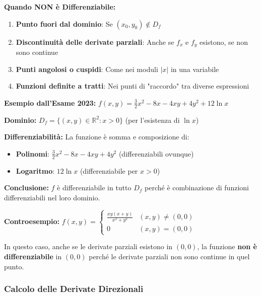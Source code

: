 \begin{errore}
\textbf{Quando NON è Differenziabile:}
\begin{enumerate}
    \item \textbf{Punto fuori dal dominio}: Se $(x_0,y_0) \notin D_f$
    \item \textbf{Discontinuità delle derivate parziali}: Anche se $f_x$ e $f_y$ esistono, se non sono continue
    \item \textbf{Punti angolosi o cuspidi}: Come nei moduli $|x|$ in una variabile
    \item \textbf{Funzioni definite a tratti}: Nei punti di "raccordo" tra diverse espressioni
\end{enumerate}
\end{errore}

\begin{esempio}
\textbf{Esempio dall'Esame 2023:} $f(x,y) = \frac{3}{2}x^{2} - 8x - 4xy + 4y^{2} + 12 \ln x$

\textbf{Dominio:} $D_f = \{(x,y) \in \mathbb{R}^2 : x > 0\}$ (per l'esistenza di $\ln x$)

\textbf{Differenziabilità:} La funzione è somma e composizione di:
\begin{itemize}
    \item \textbf{Polinomi}: $\frac{3}{2}x^{2} - 8x - 4xy + 4y^{2}$ (differenziabili ovunque)
    \item \textbf{Logaritmo}: $12 \ln x$ (differenziabile per $x > 0$)
\end{itemize}

\textbf{Conclusione:} $f$ è differenziabile in tutto $D_f$ perché è combinazione di funzioni differenziabili nel loro dominio.
\end{esempio}

\begin{esempio}
\textbf{Controesempio:} $f(x,y) = \begin{cases}\frac{xy(x+y)}{x^{2}+y^{2}} & (x,y)\ne(0,0)\\ 0 & (x,y)=(0,0)\end{cases}$

In questo caso, anche se le derivate parziali esistono in $(0,0)$, la funzione \textbf{non è differenziabile} in $(0,0)$ perché le derivate parziali non sono continue in quel punto.
\end{esempio}

\subsubsection{Calcolo delle Derivate Direzionali}

